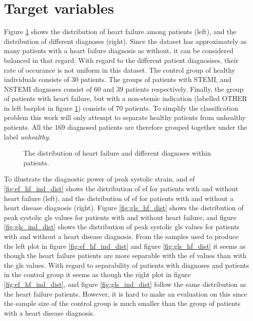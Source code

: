 \section{Target variables} \label{sec:target}
Figure \ref{fig:hf_ind_dist} shows the distribution of heart failure among patients (left), and the distribution of different diagnoses (right). Since the dataset has approximately as many patients with a heart failure diagnosis as without, it can be considered balanced in that regard. With regard to the different patient diagnosises, their rate of occurance is not uniform in this dataset. The control group of healthy individuals consists of 30 patients. The groups of patients with STEMI, and NSTEMI diagnoses consist of 60 and 39 patients respectively. Finally, the group of patients with heart failure, but with a non-stemic indication (labelled OTHER in left barplot in figure \ref{fig:hf_ind_dist}) consists of 70 patients. To simplify the classification problem this work will only attempt to separate healthy patients from unhealthy patients. All the 169 diagnosed patients are therefore grouped together under the label \textit{unhealthy}. \bigskip

\begin{figure}[h]
    \centering
    
    \caption{The distribution of heart failure and different diagnoses within patients.}
    \label{fig:hf_ind_dist}
\end{figure}

To illustrate the diagnostic power of peak systolic strain, and \acrshort{ef} \ref{fig:ef_hf_ind_dist} shows the distribution of \acrshort{ef} for patients with and without heart failure (left), and the distribution of \acrshort{ef} for patients with and without a heart disease diagnosis (right). Figure \ref{fig:gls_hf_dist} shows the distribution of peak systolic \acrshort{gls} values for patients with and without heart failure, and figure \ref{fig:gls_ind_dist} shows the distribution of peak systolic \acrshort{gls} values for patients  with and without a heart disease diagnosis. From the samples used to produce the left plot in figure \ref{fig:ef_hf_ind_dist} and figure \ref{fig:gls_hf_dist} it seems as though the heart failure patients are more separable with the \acrshort{ef} values than with the \acrshort{gls} values. With regard to separability of patients with diagnoses and patients in the control group it seems as though the right plot in figure \ref{fig:ef_hf_ind_dist}, and figure \ref{fig:gls_ind_dist} follow the same distribution as the heart failure patients. However, it is hard to make an evaluation on this since the sample size of the control group is much smaller than the group of patients with a heart disease diagnosis.\bigskip

